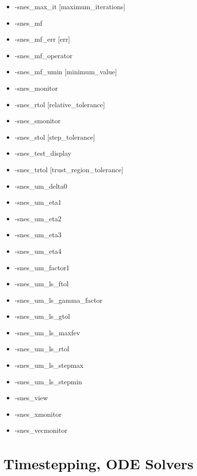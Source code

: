 {\begin{itemize}
\item -snes\_max\_it [maximum\_iterations]
\item -snes\_mf
\item -snes\_mf\_err [err]
\item -snes\_mf\_operator
\item -snes\_mf\_umin [minimum\_value]
\item -snes\_monitor
\item -snes\_rtol [relative\_tolerance]
\item -snes\_smonitor
\item -snes\_stol [step\_tolerance]
\item -snes\_test\_display 
\item -snes\_trtol [trust\_region\_tolerance]
\item -snes\_um\_delta0
\item -snes\_um\_eta1
\item -snes\_um\_eta2
\item -snes\_um\_eta3
\item -snes\_um\_eta4
\item -snes\_um\_factor1
\item -snes\_um\_ls\_ftol
\item -snes\_um\_ls\_gamma\_factor
\item -snes\_um\_ls\_gtol
\item -snes\_um\_ls\_maxfev
\item -snes\_um\_ls\_rtol
\item -snes\_um\_ls\_stepmax
\item -snes\_um\_ls\_stepmin
\item -snes\_view
\item -snes\_xmonitor
\item -snes\_vecmonitor
\end{itemize}


{\footnotesize
\noindent


}

\section{Timestepping, ODE Solvers}

}
